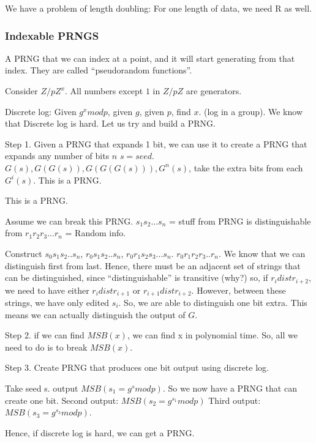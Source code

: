 We have a problem of length doubling: For one length of data, we need R as well.

\subsubsection{Indexable PRNGS}
A PRNG that we can index at a point, and it will start generating from that index. They are called ``pseudorandom functions''.

Consider $Z/pZ^x$. All numbers except $1$ in $Z/pZ$ are generators.

Discrete log: Given $g^x mod p$, given $g$, given $p$, find $x$. (log in a group). We know that Discrete log is hard. Let us try and build a PRNG.


Step 1. Given a PRNG that expands 1 bit, we can use it to create a PRNG that expands any number of bits $n$
$s = seed$. 
$G(s), G(G(s)), G(G(G(s))), G^n(s)$, take the extra bits from each $G^i(s)$. This is a PRNG.

This is a PRNG.

Assume we can break this PRNG. $s_1 s_2 ... s_n$ = stuff from PRNG is distinguishable from $r_1 r_2 r_3 ... r_n$ = Random info.

Construct $s_0 s_1 s_2 .. s_n$, $r_0 s_1 s_2.. s_n$, $r_0 r_1 s_2 s_3 ... s_n$. $r_0 r_1 r_2 r_3 .. r_n$. We know that we can
distinguish first from last. Hence, there must be an adjacent set of strings that can be distinguished, since ``distinguishable'' is transitive (why?)
so, if $r_i  dist r_{i+2}$, we need to have either $r_i dist r_{i + 1}$ or $r_{i + 1} dist r_{i + 2}$. However, between these strings, we have only edited $s_i$.
So, we are able to distinguish one bit extra. This means we can actually distinguish the output of $G$.


Step 2. if we can find $MSB(x)$, we can find x in polynomial time. So, all we need to do is to break $MSB(x)$.


Step 3. Create PRNG that produces one bit output using discrete log.

Take seed s. output $MSB(s_1 = g^s mod p)$. So we now have a PRNG that can create one bit. Second output: $MSB(s_2 = g^{s_1} mod p )$
Third output: $MSB(s_3 = g^{s_3} mod p)$.

Hence, if discrete log is hard, we can get a PRNG. 
